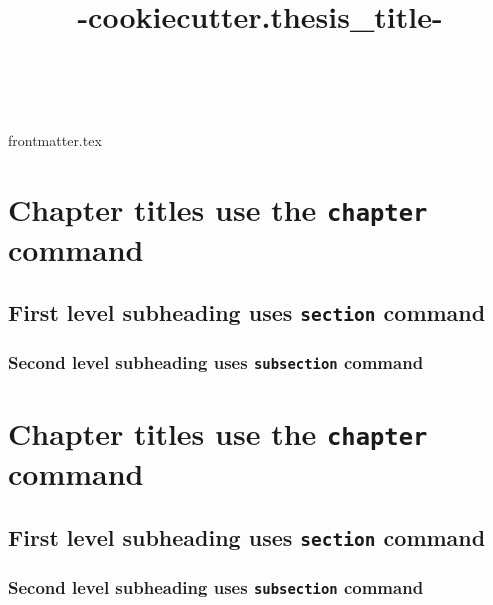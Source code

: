 \documentclass{book}
\title{ {{-cookiecutter.thesis_title-}} }
\author{\givenname\ \surname}
\begin{document}
{frontmatter.tex}

\chapter{Chapter titles use the \texttt{chapter} command}

\section{First level subheading uses \texttt{section} command}

\subsection{Second level subheading uses \texttt{subsection} command}

\chapter{Chapter titles use the \texttt{chapter} command}

\section{First level subheading uses \texttt{section} command}

\subsection{Second level subheading uses \texttt{subsection} command}
\end{document}
